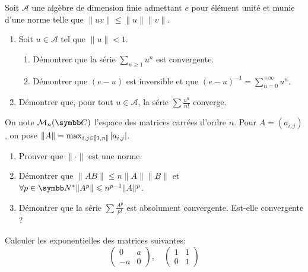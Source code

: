 \begin{exercice}
    Soit $\mathcal{A}$ une algèbre de dimension finie admettant $e$ pour élément unité et munie d'une norme telle que $\|uv\| \leqslant \|u\|\|v\|$.
    \begin{enumerate}
        \item Soit $u \in \mathcal{A}$ tel que $\|u\| < 1$.
        \begin{enumerate}
            \item Démontrer que la série $\sum_{n\geqslant1} u^{n}$ est convergente.
            \item Démontrer que $(e-u)$ est inversible et que $\displaystyle (e-u)^{-1}=\sum_{n=0}^{+\infty}u^{n}$.
        \end{enumerate}
        \item Démontrer que, pour tout $u \in \mathcal{A}$, la série $\sum\frac{u^{n}}{n!}$ converge.
    \end{enumerate}
\end{exercice}

\begin{exercice}
    On note $\mathcal{M}_{n}(\C)$ l'espace des matrices carrées d'ordre $n$. Pour $A=(a_{i,j})$, on pose $\|A\| = \max_{i,j \in [\![1, n]\!]} |a_{i,j}|$.
    \begin{enumerate}
        \item Prouver que $\|\cdot\|$ est une norme.
        \item Démontrer que $\|AB\| \leqslant n\|A\|\|B\|$ et $\forall p \in \N^* \|A^p\| \leqslant n^{p-1}\|A\|^p$.
        \item Démontrer que la série $\sum\frac{A^{p}}{p!}$ est absolument convergente. Est-elle convergente ?
    \end{enumerate}
\end{exercice}

\begin{exercice}
    Calculer les exponentielles des matrices suivantes:
    \[\begin{pmatrix} 0 & a \\ -a & 0 \end{pmatrix}, \quad \begin{pmatrix} 1 & 1 \\ 0 & 1 \end{pmatrix}\]

\end{exercice}

